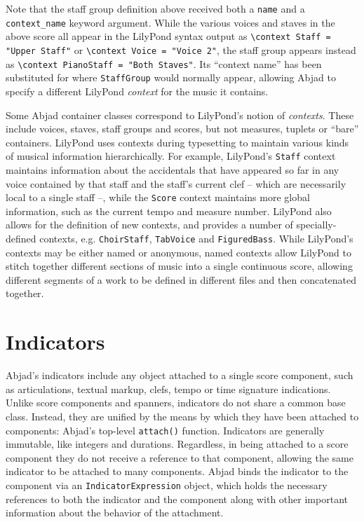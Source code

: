 \noindent Note that the staff group definition above received both a
\texttt{name} and a \texttt{context\_name} keyword argument. While the various
voices and staves in the above score all appear in the LilyPond syntax output
as \texttt{\textbackslash{}context Staff = "Upper Staff"} or
\texttt{\textbackslash{}context Voice = "Voice 2"}, the staff group appears
instead as \texttt{\textbackslash{}context PianoStaff = "Both Staves"}. Its
\enquote{context name} has been substituted for where \texttt{StaffGroup} would
normally appear, allowing Abjad to specify a different LilyPond \emph{context}
for the music it contains.

Some Abjad container classes correspond to LilyPond's notion of
\emph{contexts}. These include voices, staves, staff groups and scores, but not
measures, tuplets or \enquote{bare} containers. LilyPond uses contexts during
typesetting to maintain various kinds of musical information hierarchically.
For example, LilyPond's \texttt{Staff} context maintains information about the
accidentals that have appeared so far in any voice contained by that staff and
the staff's current clef -- which are necessarily local to a single staff --,
while the \texttt{Score} context maintains more global information, such as the
current tempo and measure number. LilyPond also allows for the definition of
new contexts, and provides a number of specially-defined contexts, e.g.
\texttt{ChoirStaff}, \texttt{TabVoice} and \texttt{FiguredBass}. While
LilyPond's contexts may be either named or anonymous, named contexts allow
LilyPond to stitch together different sections of music into a single
continuous score, allowing different segments of a work to be defined in
different files and then concatenated together.

\section{Indicators}

Abjad's indicators include any object attached to a single score component,
such as articulations, textual markup, clefs, tempo or time signature
indications. Unlike score components and spanners, indicators do not share a
common base class. Instead, they are unified by the means by which they have
been attached to components: Abjad's top-level \texttt{attach()} function.
Indicators are generally immutable, like integers and durations. Regardless, in
being attached to a score component they do not receive a reference to that
component, allowing the same indicator to be attached to many components. Abjad
binds the indicator to the component via an \texttt{IndicatorExpression}
object, which holds the necessary references to both the indicator and the
component along with other important information about the behavior of the
attachment.

